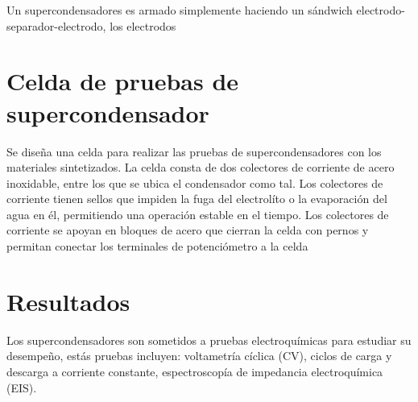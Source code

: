 Un supercondensadores es armado simplemente haciendo un sándwich electrodo-separador-electrodo, los electrodos

\section{Celda de pruebas de supercondensador}
Se diseña una celda para realizar las pruebas de supercondensadores con los materiales sintetizados. La celda consta de dos colectores de corriente de acero inoxidable, entre los que se ubica el condensador como tal. Los colectores de corriente tienen sellos que impiden la fuga del electrolíto o la evaporación del agua en él, permitiendo una operación estable en el tiempo. Los colectores de corriente se apoyan en bloques de acero que cierran la celda con pernos y permitan conectar los terminales de potenciómetro a la celda

\begin{figure}[h!]
	\centering
	\label{fig:celda_de_pruebas_SC}
\end{figure}


\section{Resultados}
Los supercondensadores son sometidos a pruebas electroquímicas para estudiar su desempeño, estás pruebas incluyen: voltametría cíclica (CV), ciclos de carga y descarga a corriente constante, espectroscopía de impedancia electroquímica (EIS).

